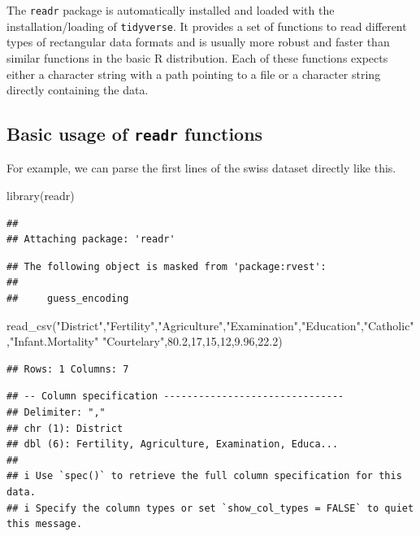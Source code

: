 \documentclass[
  12pt,
]{style/krantz}
\newenvironment{Shaded}{\begin{snugshade}}{\end{snugshade}}
\newcommand{\FunctionTok}[1]{\textcolor[rgb]{0.00,0.00,0.00}{#1}}
\newcommand{\NormalTok}[1]{#1}
\newcommand{\StringTok}[1]{\textcolor[rgb]{0.31,0.60,0.02}{#1}}
\begin{document}
The \texttt{readr} package is automatically installed and loaded with the installation/loading of \texttt{tidyverse}. It provides a set of functions to read different types of rectangular data formats and is usually more robust and faster than similar functions in the basic R distribution. Each of these functions expects either a character string with a path pointing to a file or a character string directly containing the data.

\hypertarget{basic-usage-of-readr-functions}{%
\subsection{\texorpdfstring{Basic usage of \texttt{readr} functions}{Basic usage of readr functions}}\label{basic-usage-of-readr-functions}}

For example, we can parse the first lines of the swiss dataset directly like this.

\begin{Shaded}
\begin{Highlighting}[]
\FunctionTok{library}\NormalTok{(readr)}
\end{Highlighting}
\end{Shaded}

\begin{verbatim}
## 
## Attaching package: 'readr'
\end{verbatim}

\begin{verbatim}
## The following object is masked from 'package:rvest':
## 
##     guess_encoding
\end{verbatim}

\begin{Shaded}
\begin{Highlighting}[]
\FunctionTok{read\_csv}\NormalTok{(}\StringTok{\textquotesingle{}"District","Fertility","Agriculture","Examination","Education","Catholic","Infant.Mortality"}
\StringTok{"Courtelary",80.2,17,15,12,9.96,22.2\textquotesingle{}}\NormalTok{)}
\end{Highlighting}
\end{Shaded}

\begin{verbatim}
## Rows: 1 Columns: 7
\end{verbatim}

\begin{verbatim}
## -- Column specification -------------------------------
## Delimiter: ","
## chr (1): District
## dbl (6): Fertility, Agriculture, Examination, Educa...
## 
## i Use `spec()` to retrieve the full column specification for this data.
## i Specify the column types or set `show_col_types = FALSE` to quiet this message.
\end{verbatim}
\end{document}
